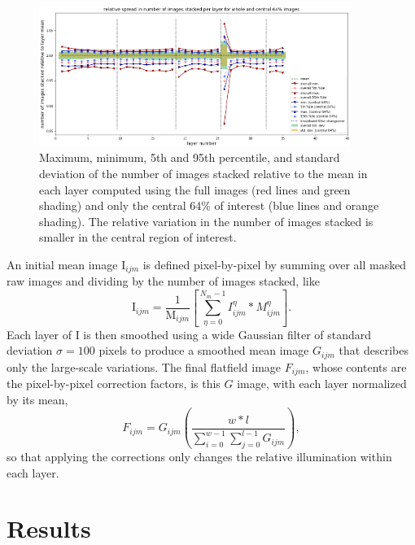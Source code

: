 \documentclass[letterpaper,11pt]{article}
\newcommand{\Iota}{\mathrm{I}}
\newcommand{\Mu}{\mathrm{M}}
\begin{document}
\begin{figure}[!ht]
\centering
\includegraphics[width=0.90\textwidth]{images/measuring_flatfield_corrections/mask_stack_variation_reduction}
\caption{\footnotesize Maximum, minimum, 5th and 95th percentile, and standard deviation of the number of images stacked relative to the mean in each layer computed using the full images (red lines and green shading) and only the central 64\% of interest (blue lines and orange shading). The relative variation in the number of images stacked is smaller in the central region of interest.}
\label{fig:removing_image_edges_effect_on_mask_stacks}
\end{figure} 

An initial mean image $\Iota_{ijm}$ is defined pixel-by-pixel by summing over all masked raw images and dividing by the number of images stacked, like
\begin{equation}
\Iota_{ijm} = \frac{1}{\Mu_{ijm}} \left[ \sum_{\eta=0}^{N_{m}-1} I^{\eta}_{ijm}*M^{\eta}_{ijm} \right] .
\end{equation}
Each layer of $\Iota$ is then smoothed using a wide Gaussian filter of standard deviation $\sigma=100$ pixels to produce a smoothed mean image $G_{ijm}$ that describes only the large-scale variations. The final flatfield image $F_{ijm}$, whose contents are the pixel-by-pixel correction factors, is this $G$ image, with each layer normalized by its mean,
\begin{equation}
F_{ijm} = G_{ijm} \left( \frac{w*l}{\sum_{i=0}^{w-1}\sum_{j=0}^{l-1}G_{ijm}} \right) ,
\end{equation}
so that applying the corrections only changes the relative illumination within each layer. 

\section{Results}
\label{sec:results}
\end{document}
